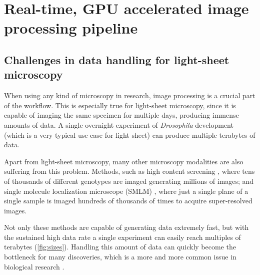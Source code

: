 

\chapter{Real-time, GPU accelerated image processing pipeline}

\graphicspath{{./figures/4_gpu/}}


\section{Challenges in data handling for light-sheet microscopy}

  When using any kind of microscopy in research, image processing is a crucial part of the workflow. This is especially true for light-sheet microscopy, since it is capable of imaging the same specimen for multiple days, producing immense amounts of data. A single overnight experiment of \textit{Drosophila} development (which is a very typical use-case for light-sheet) can produce multiple terabytes of data.

  Apart from light-sheet microscopy, many other microscopy modalities are also suffering from this problem. Methods, such as high content screening \cite{carpenter_systematic_2004,echeverri_high-throughput_2006,pepperkok_high-throughput_2006}, where tens of thousands of different genotypes are imaged generating millions of images; and single molecule localization microscope (SMLM) \cite{betzig_imaging_2006,hess_ultra-high_2006,rust_sub-diffraction-limit_2006}, where just a single plane of a single sample is imaged hundreds of thousands of times to acquire super-resolved images.

  Not only these methods are capable of generating data extremely fast, but with the sustained high data rate a single experiment can easily reach multiples of terabytes (\autoref{fig:sizes}). Handling this amount of data can quickly become the bottleneck for many discoveries, which is a more and more common issue in biological research \cite{wollman_high_2007,reynaud_guide_2015,perkel_struggle_2016}. 



